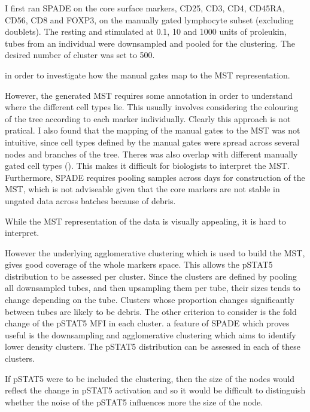 I first ran \gls{SPADE} on the core surface markers, CD25, CD3, CD4, CD45RA, CD56, CD8 and FOXP3,
on the manually gated lymphocyte subset (excluding doublets).
The resting and stimulated at 0.1, 10 and 1000 units of proleukin,
tubes from an individual were downsampled and pooled for the clustering.
The desired number of cluster was set to 500.

in order to investigate how the manual gates map to the \gls{MST} representation.


However, the generated \gls{MST} requires some annotation in order to understand where the different cell types lie.
This usually involves considering the colouring of the tree according to each marker individually.
Clearly this approach is not pratical.
I also found that the mapping of the manual gates to the MST was not intuitive,
since cell types defined by the manual gates were spread across several nodes and branches of the tree.
Theres was also overlap with different manually gated cell types ().
This makes it difficult for biologists to interpret the \gls{MST}.
Furthermore, SPADE requires pooling samples across days for construction of the \gls{MST}, which is not adviseable given that the core
markers are not stable in ungated data across batches because of debris.

While the MST representation of the data is visually appealing, it is hard to interpret.

However the underlying agglomerative clustering which is used to build the MST, gives good coverage of the whole markers space.
This allows the pSTAT5 distribution to be assessed per cluster.
Since the clusters are defined by pooling all downsampled tubes, and then upsampling them per tube,
their sizes tends to change depending on the tube.
Clusters whose proportion changes significantly between tubes are likely to be debris.
The other criterion to consider is the fold change of the pSTAT5 MFI in each cluster.
a feature of SPADE which proves useful is the downsampling and agglomerative clustering which aims to identify lower density clusters.
The pSTAT5 distribution can be assessed in each of these clusters.

If pSTAT5 were to be included the clustering, then the size of the nodes would reflect the change in pSTAT5 activation and so it would be
difficult to distinguish whether the noise of the pSTAT5 influences more the size of the node.



